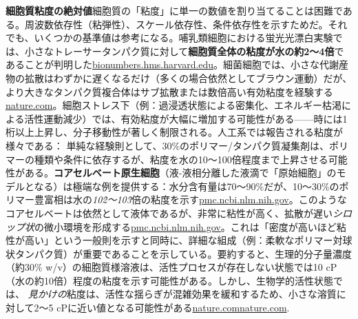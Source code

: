 \textbf{細胞質粘度の絶対値}細胞質の「粘度」に単一の数値を割り当てることは困難である。周波数依存性（粘弾性）、スケール依存性、条件依存性を示すためだ。それでも、いくつかの基準値は参考になる。哺乳類細胞における蛍光光漂白実験では、小さなトレーサータンパク質に対して\textbf{細胞質全体の粘度が水の約2～4倍}であることが判明した\href{https://bionumbers.hms.harvard.edu/bionumber.aspx?id=102561&ver=2\#:~:text=Value\%203,S65T\%20in}{bionumbers.hms.harvard.edu}。細菌細胞では、小さな代謝産物の拡散はわずかに遅くなるだけ（多くの場合依然としてブラウン運動）だが、より大きなタンパク質複合体はサブ拡散または数倍高い有効粘度を経験する\href{https://www.nature.com/articles/nrmicro.2017.17?error=cookies_not_supported&code=87b4b2eb-5370-49be-862f-ed6bad1e1b44\#:~:text=Macromolecular\%20crowding\%20affects\%20the\%20mobility,we\%20propose\%20that\%20the\%20term}{nature.com}。細胞ストレス下（例：過浸透状態による密集化、エネルギー枯渇による活性運動減少）では、有効粘度が大幅に増加する可能性がある——時には1桁以上上昇し、分子移動性が著しく制限される。人工系では報告される粘度が様々である： 単純な経験則として、30\%のポリマー/タンパク質凝集剤は、ポリマーの種類や条件に依存するが、粘度を水の10～100倍程度まで上昇させる可能性がある。\textbf{コアセルベート原生細胞}（液-液相分離した液滴で「原始細胞」のモデルとなる）は極端な例を提供する：水分含有量は70～90\%だが、10～30\%のポリマー豊富相は水の\textit{10\^2～10\^3}倍の粘度を示す\href{https://pmc.ncbi.nlm.nih.gov/articles/PMC11256357/\#:~:text=The\%20high\%20macromolecular\%20content\%20of,ribozymes\%20and\%20other\%20large\%20molecules}{pmc.ncbi.nlm.nih.gov}。このようなコアセルベートは依然として液体であるが、非常に粘性が高く、拡散が遅い\textit{シロップ状}の微小環境を形成する\href{https://pmc.ncbi.nlm.nih.gov/articles/PMC11256357/\#:~:text=The\%20high\%20macromolecular\%20content\%20of,ribozymes\%20and\%20other\%20large\%20molecules}{pmc.ncbi.nlm.nih.gov}。これは「密度が高いほど粘性が高い」という一般則を示すと同時に、詳細な組成（例：柔軟なポリマー対球状タンパク質）が重要であることを示している。要約すると、生理的分子量濃度（約30\% w/v）の細胞質様溶液は、活性プロセスが存在しない状態では10 cP（水の約10倍）程度の粘度を示す可能性がある。しかし、生物学的活性状態では、 \textit{見かけの}粘度は、活性な揺らぎが混雑効果を緩和するため、小さな溶質に対して2～5 cPに近い値となる可能性がある\href{https://www.nature.com/articles/nrmicro.2017.17?error=cookies_not_supported&code=87b4b2eb-5370-49be-862f-ed6bad1e1b44\#:~:text=Macromolecular\%20crowding\%20affects\%20the\%20mobility,we\%20propose\%20that\%20the\%20term}{nature.com}\href{https://www.nature.com/articles/s41598-017-14883-y?error=cookies_not_supported&code=b0600d9e-c852-48ed-ab9c-7526a5c6893b\#:~:text=of\%20living\%20cells\%20was\%20lost,the\%20loss\%20of\%20fragility\%2C\%20in}{nature.com}.

